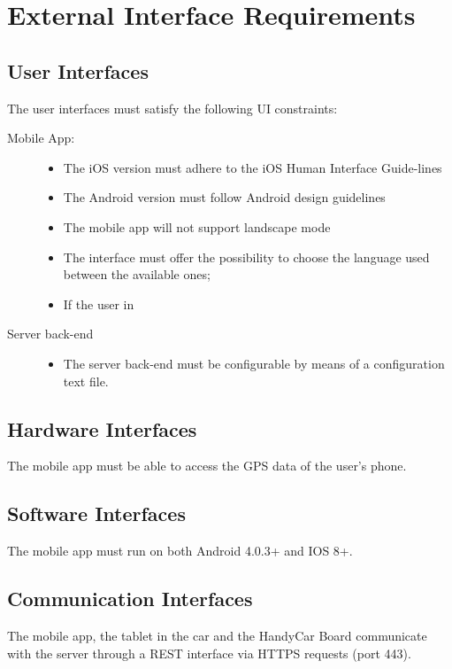 \section{External Interface Requirements}

\subsection{User Interfaces}
The user interfaces must satisfy the following UI constraints:
\begin{description}
\item[Mobile App:]
	\begin{itemize}
	\item The iOS version must adhere to the iOS Human Interface Guide-lines
	\item The Android version must follow Android design guidelines
	\item The mobile app will not support landscape mode
	\item The interface must offer the possibility to choose the language used between the available ones;
	\item If the user in 
	\end{itemize}
\item[Server back-end]
	\begin{itemize}
	\item The server back-end must be configurable by means of a configuration text file.
	\end{itemize}
\end{description}

\subsection{Hardware Interfaces}
The mobile app must be able to access the GPS data of the user’s phone.
\subsection{Software Interfaces}
The mobile app must run on both Android 4.0.3+ and IOS 8+.

\subsection{Communication Interfaces}
The mobile app, the tablet in the car and the HandyCar Board communicate with the server through a REST interface via HTTPS requests (port 443).
